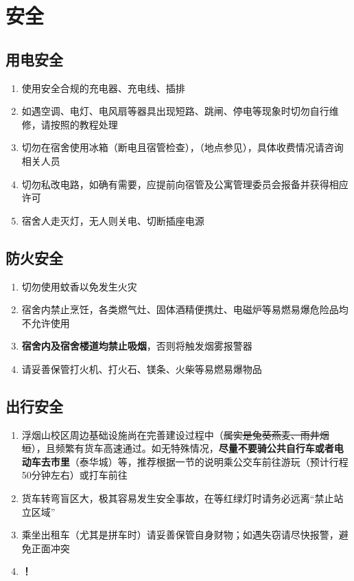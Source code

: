 \chapter[安全]{安全}

\section[用电安全]{用电安全}
\begin{enumerate}
    \item 使用安全合规的充电器、充电线、插排
    \item 如遇空调、电灯、电风扇等器具出现短路、跳闸、停电等现象时切勿自行维修，请按照的教程处理
    \item 切勿在宿舍使用冰箱（断电且宿管检查），\textbf{}（地点参见），具体收费情况请咨询相关人员
    \item 切勿私改电路，如确有需要，应提前向宿管及公寓管理委员会\footnotemark 报备并获得相应许可
    \item 宿舍人走灭灯，无人则关电、切断插座电源
\end{enumerate}

\section[防火安全]{防火安全}
\begin{enumerate}
    \item 切勿使用蚊香以免发生火灾
    \item 宿舍内禁止烹饪，各类燃气灶、固体酒精便携灶、电磁炉等易燃易爆危险品均不允许使用
    \item \textbf{宿舍内及宿舍楼道均禁止吸烟}，否则将触发烟雾报警器
    \item 请妥善保管打火机、打火石、镁条、火柴等易燃易爆物品
\end{enumerate}

\section[出行安全]{出行安全}
\begin{enumerate}
    \item 浮烟山校区周边基础设施尚在完善建设过程中（\st{属实是兔葵燕麦、雨井烟垣}），且频繁有货车高速通过。如无特殊情况，\textbf{尽量不要骑公共自行车或者电动车去市里}（泰华城）等，推荐根据一节的说明乘公交车前往游玩（预计行程50分钟左右）或打车前往
    \item 货车转弯盲区大，极其容易发生安全事故，在等红绿灯时请务必远离“禁止站立区域”
    \item 乘坐出租车（尤其是拼车时）请妥善保管自身财物；如遇失窃请尽快报警，避免正面冲突
    \item \textbf{！}
\end{enumerate}

